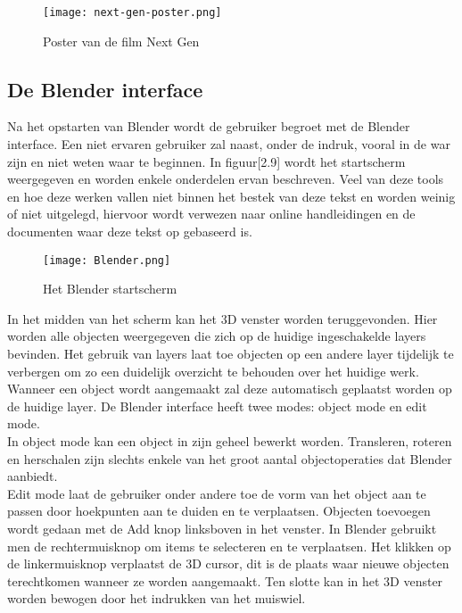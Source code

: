 \begin{figure}[H]
\texttt{[image: next-gen-poster.png]}
\caption{Poster van de film Next Gen \citep*{NEXT1}}
\end{figure}

    



\subsection{De Blender interface}
Na het opstarten van Blender wordt de gebruiker begroet met de Blender interface. Een niet ervaren gebruiker zal naast, onder de indruk, vooral in de war zijn en niet weten waar te beginnen. In figuur[2.9] wordt het startscherm weergegeven en worden enkele onderdelen ervan beschreven. Veel van deze tools en hoe deze werken vallen niet binnen het bestek van deze tekst en worden weinig of niet uitgelegd, hiervoor wordt verwezen naar online handleidingen en de documenten waar deze tekst op gebaseerd is.\citep*{BLEN1}\citep*{API1} 

\begin{figure}[h]
\texttt{[image: Blender.png]}
\caption{Het Blender startscherm}
\end{figure}

\par
In het midden van het scherm kan het 3D venster worden teruggevonden. Hier worden alle objecten weergegeven die zich op de huidige ingeschakelde layers bevinden. Het gebruik van layers laat toe objecten op een andere layer tijdelijk te verbergen om zo een duidelijk overzicht te behouden over het huidige werk. Wanneer een object wordt aangemaakt zal deze automatisch geplaatst worden op de huidige layer. De Blender interface heeft twee modes: object mode en edit mode.
\\
In object mode kan een object in zijn geheel bewerkt worden. Transleren, roteren en herschalen zijn slechts enkele van het groot aantal objectoperaties dat Blender aanbiedt. 
\\
Edit mode laat de gebruiker onder andere toe de vorm van het object aan te passen door hoekpunten aan te duiden en te verplaatsen. 
Objecten toevoegen wordt gedaan met de Add knop linksboven in het venster. 
In Blender gebruikt men de rechtermuisknop om items te selecteren en te verplaatsen. Het klikken op de linkermuisknop verplaatst de 3D cursor, dit is de plaats waar nieuwe objecten terechtkomen wanneer ze worden aangemaakt. Ten slotte kan in het 3D venster worden bewogen door het indrukken van het muiswiel.

